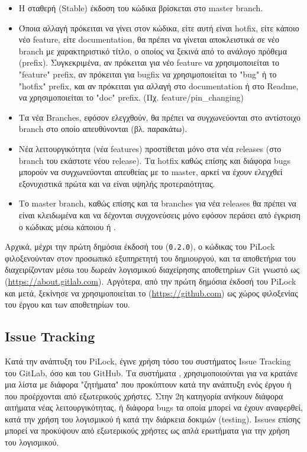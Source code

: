 		\begin{itemize}
			\item Η σταθερή (Stable) έκδοση του κώδικα βρίσκεται στο master branch.
			\item Όποια αλλαγή πρόκειται να γίνει στον κώδικα, είτε αυτή είναι hotfix, είτε κάποιο νέο feature, είτε documentation, θα πρέπει να γίνεται αποκλειστικά σε νέο branch με χαρακτηριστικό τίτλο, ο οποίος να ξεκινά από το ανάλογο πρόθεμα (prefix). Συγκεκριμένα, αν πρόκειται για νέο feature να χρησιμοποιείται το "feature" prefix, αν πρόκειται για bugfix να χρησιμοποιείται το "bug" ή το "hotfix" prefix, και αν πρόκειται για αλλαγή στο documentation ή στο Readme, να χρησιμοποιείται το "doc" prefix. (Πχ. feature/pin\_changing)
			\item Τα νέα Branches, εφόσον ελεγχθούν, θα πρέπει να συγχωνεύονται στο αντίστοιχο branch στο οποίο απευθύνονται (βλ. παρακάτω).
			\item Νέα λειτουργικότητα (νέα features) προστίθεται μόνο στα νέα releases (στο branch του εκάστοτε νέου release). Τα hotfix καθώς επίσης και διάφορα bugs μπορούν να συγχωνεύονται απευθείας με το master, αρκεί να έχουν ελεγχθεί εξονυχιστικά πρώτα και να είναι υψηλής προτεραιότητας.
			\item Το master branch, καθώς επίσης και τα branches για νέα releases θα πρέπει να είναι κλειδωμένα και να δέχονται συγχονεύσεις μόνο εφόσον περάσει από έγκριση ο κώδικας μέσω κάποιου  ή .
		\end{itemize} 

		Αρχικά, μέχρι την πρώτη δημόσια έκδοσή του (\verb|0.2.0|), ο κώδικας του PiLock φιλοξενούνταν στον προσωπικό εξυπηρετητή του δημιουργού, και τα αποθετήρια του διαχειρίζονταν μέσω του δωρεάν λογισμικού διαχείρησης αποθετηρίων Git γνωστό ως  (\url{https://about.gitlab.com}). Αργότερα, από την πρώτη δημόσια έκδοσή του PiLock και μετά, ξεκίνησε να χρησιμοποιείται το  (\url{https://github.com}) ως χώρος φιλοξενίας του έργου και των αποθετηρίων του.

	\subsection{Issue Tracking}
		Κατά την ανάπτυξη του PiLock, έγινε χρήση τόσο του συστήματος Issue Tracking του GitLab, όσο και του GitHub. Τα συστήματα , χρησιμοποιούνται για να κρατάνε μια λίστα με διάφορα "ζητήματα" που προκύπτουν κατά την ανάπτυξη ενός έργου ή που προέρχονται από εξωτερικούς χρήστες. Στην 2η κατηγορία ανήκουν διάφορα αιτήματα νέας λειτουργικότητας, ή διάφορα bugs τα οποία μπορεί να έχουν αναφερθεί, κατά την χρήση του λογισμικού ή κατά την διάρκεια δοκιμών (testing). Issues επίσης μπορεί να προκύψουν από εξωτερικούς χρήστες ως απλά ερωτήματα για την χρήση του λογισμικού.

